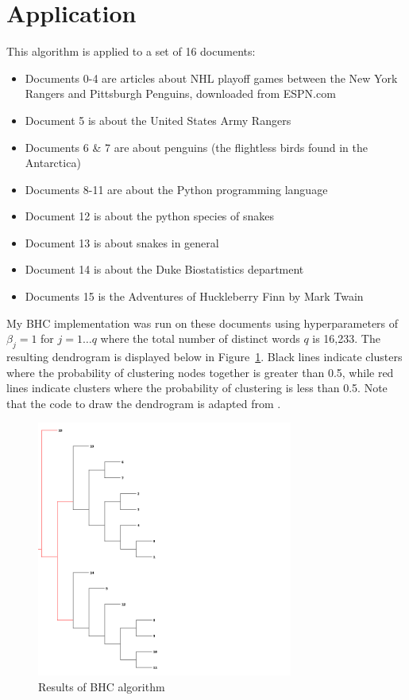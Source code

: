 \documentclass{article}
\begin{document}
\section{Application}
This algorithm is applied to a set of 16 documents:
\begin{itemize}
    \item Documents 0-4 are articles about NHL playoff games between the New York Rangers and Pittsburgh Penguins, downloaded from ESPN.com
    \item Document 5 is about the United States Army Rangers
    \item Documents 6 \& 7 are about penguins (the flightless birds found in the Antarctica)
    \item Documents 8-11 are about the Python programming language
    \item Document 12 is about the python species of snakes
    \item Document 13 is about snakes in general
    \item Document 14 is about the Duke Biostatistics department
    \item Documents 15 is the Adventures of Huckleberry Finn by Mark Twain
\end{itemize}
My BHC implementation was run on these documents using hyperparameters of $\beta_j = 1$ for $j=1\dots q$ where the total number of distinct words $q$ is 16,233.  The resulting dendrogram is displayed below in Figure~\ref{fig:BHC}.  Black lines indicate clusters where the probability of clustering nodes together is greater than 0.5, while red lines indicate clusters where the probability of clustering is less than 0.5.  Note that the code to draw the dendrogram is adapted from \cite{Segaran}.
\begin{figure}[h!]
\centering
\includegraphics[width=0.75\textwidth]{clusters.png}
\caption{Results of BHC algorithm}
\label{fig:BHC}
\end{figure}
\end{document}
